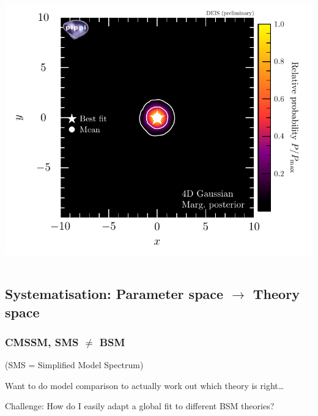 \documentclass[xcolor=dvipsnames]{beamer}
\begin{document}
\begin{frame}
{\begin{columns}
    \includegraphics[width=\textwidth]{example_4_5_post2D}
  \end{columns}
}

\end{frame}


\subsection{Systematisation: Parameter space $\rightarrow$ Theory space}

\begin{frame}
\frametitle{CMSSM, SMS $\ne$ BSM}

(SMS = Simplified Model Spectrum)
\vspace{3mm}

Want to do model comparison to actually work out which theory is right\ldots
\vspace{3mm}

\begin{exampleblock}{Challenge:}
How do I easily adapt a global fit to different BSM theories?
\end{exampleblock}


\end{frame}
\end{document}
